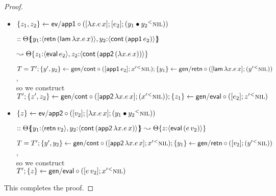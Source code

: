 \begin{proof}
\begin{itemize}
    \medskip


  \item $\{{z_1, z_2}\} \leftarrow {\sf ev/app1} \circ {([{\lambda x.e\,x}]; {[{e_2}]; {({{y_1} \mathbin{\bullet}{y_2}}{^{<}}{\textsc{nil}})}})}$

    \qquad $:: {\Theta}\mbox{$\{\hspace{-4pt}\{$}{{y_1{:}\langle {{\sf retn}\,({\sf lam}\,\lambda x.e\,x)} \rangle},{y_2{:}\langle {{\sf cont}\,({\sf app1}\,e_2)} \rangle}}\mbox{$\}\hspace{-4pt}\}$}$

    \qquad\qquad
               $\leadsto
               {\Theta}\{{{z_1{:}\langle {{\sf eval}\,e_2} \rangle},{z_2{:}\langle {{\sf cont}\,({\sf app2}\,(\lambda x.e\,x))} \rangle}}\} $

    \medskip

    $T =
     T'; 
     \{{y', y_2}\} \leftarrow {\sf gen/cont} \circ {([{{\sf app1}\,e_2}]; {{x'}{^{<}}{\textsc{nil}}})};
     \{{y_1}\} \leftarrow {\sf gen/retn} \circ {([{{\sf lam}\,\lambda x.e\,x}]; {({y'}{^{<}}{\textsc{nil}})})}$,\\
    so we construct\\
    $T'; 
     \{{z', z_2}\} \leftarrow {\sf gen/cont} \circ {([{{\sf app2}\,\lambda x.e\,x}]; {({x'}{^{<}}{\textsc{nil}})})};
     \{{z_1}\} \leftarrow {\sf gen/eval} \circ {([{e_2}]; {{z'}{^{<}}{\textsc{nil}}})}$

    \medskip

  \item $\{{z}\} \leftarrow {\sf ev/app2} \circ {([{v_2}]; {[{\lambda x.e\,x}]; {({{y_1} \mathbin{\bullet}{y_2}}{^{<}}{\textsc{nil}})}})}$

    \qquad $:: {\Theta}\mbox{$\{\hspace{-4pt}\{$}{{y_1{:}\langle {{\sf retn}\,v_2} \rangle},{y_2{:}\langle {{\sf cont}\,({\sf app2}\,\lambda x.e\,x)} \rangle}}\mbox{$\}\hspace{-4pt}\}$}
               \leadsto
               {\Theta}\{{z{:}\langle {{\sf eval}\,(e\,v_2)} \rangle}\} $

    \medskip

    $T =
     T'; 
     \{{y', y_2}\} \leftarrow {\sf gen/cont} \circ {([{{\sf app2}\,\lambda x.e\,x}]; {{x'}{^{<}}{\textsc{nil}}})};
     \{{y_1}\} \leftarrow {\sf gen/retn} \circ {([{v_2}]; {({y'}{^{<}}{\textsc{nil}})})}$,\\
    so we construct\\
    $T'; 
     \{{z}\} \leftarrow {\sf gen/eval} \circ {([{e\,v_2}]; {{x'}{^{<}}{\textsc{nil}}})}$

    \medskip

  \end{itemize}

\noindent
This completes the proof. 
\end{proof}

